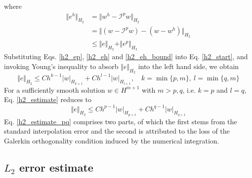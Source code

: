 where
\begin{equation}\label{h2_eh_bound}
	\begin{aligned}
		\Vert e^h \Vert_{H_2} &= \Vert w^h - \mathcal I^p w \Vert_{H_2} \\
		&= \Vert (w - \mathcal I^p w) - (w - w^h) \Vert_{H_2} \\
		&\le \Vert e \Vert_{H_2} + \Vert e^p \Vert_{H_2}
	\end{aligned}
\end{equation}
Substituting Eqs. \eqref{h2_ep}, \eqref{h2_eh} and \eqref{h2_eh_bound} into Eq. \eqref{h2_start}, and invoking Young's inequality \cite{} to absorb $\Vert e \Vert_{H_2}$ into the left hand side, we obtain
\begin{equation}\label{h2_estimate}
	\Vert e \Vert_{H_2}\le C h^{k-1}\vert w \vert_{H_{k+1}}+C h^{l-1}\vert w \vert_{H_{l+1}},\quad k=\min\{p,m\},\ l=\min\{q,m\}
\end{equation}
For a sufficiently smooth solution $w\in H^{m+1}$ with $m>p,q$, i.e. $k=p$ and $l=q$, Eq. \eqref{h2_estimate} reduces to
\begin{equation}\label{h2_estimate_pq}
	\Vert e \Vert_{H_2}\le C h^{p-1}\vert w \vert_{H_{p+1}}+C h^{q-1}\vert w \vert_{H_{q+1}}
\end{equation}
Eq. \eqref{h2_estimate_pq} comprises two parts, of which the first stems from the standard interpolation error and the second is attributed to the loss of the Galerkin orthogonality condition induced by the numerical integration.

\subsection{$L_2$ error estimate}\label{sec:l2}

